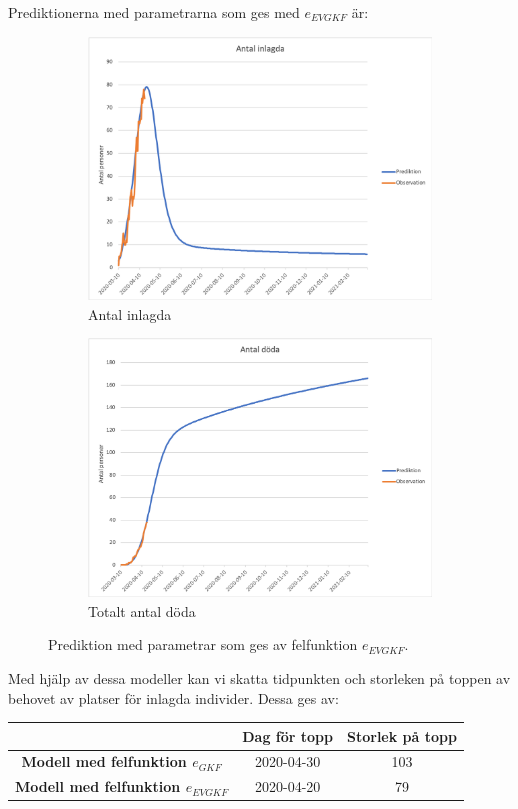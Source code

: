 \documentclass[a4paper, 12pt]{article}
\theoremstyle{definition}
\begin{document}
Prediktionerna med parametrarna som ges med $e_{EVGKF}$ är:
\begin{figure}[H]
\centering
\begin{subfigure}[b]{.49\textwidth}
\centering
\includegraphics[width=.9\hsize]{bilder/antal_inlagda_predikterat_20200417_evgkf.png}
\caption{Antal inlagda}
\end{subfigure}
\begin{subfigure}[b]{.49\textwidth}
\centering
\includegraphics[width=.9\hsize]{bilder/antal_doda_predikterat_20200417_evgkf.png}
\caption{Totalt antal döda}
\end{subfigure}
\caption{Prediktion med parametrar som ges av felfunktion $e_{EVGKF}$.}
\end{figure}
Med hjälp av dessa modeller kan vi skatta tidpunkten och storleken på toppen av behovet av platser för inlagda individer. Dessa ges av:
\begin{center}
  \begin{tabular}{c | c | c}
     & \textbf{Dag för topp} & \textbf{Storlek på topp} \\ \hline
    \textbf{Modell med felfunktion $e_{GKF}$} & 2020-04-30 & 103 \\ \hline
    \textbf{Modell med felfunktion $e_{EVGKF}$} & 2020-04-20 & 79
  \end{tabular}
\end{center}
\end{document}
